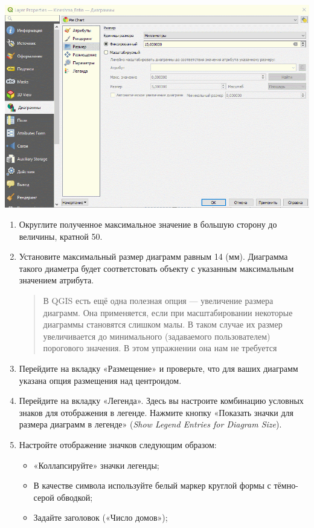 \documentclass[
  12pt,
]{book}
\providecommand{\tightlist}{%
  \setlength{\itemsep}{0pt}\setlength{\parskip}{0pt}}
\begin{document}
\includegraphics{images/Ex05_Vectorization/diagrams1.gif}

\begin{enumerate}
\def\labelenumi{\arabic{enumi}.}
\setcounter{enumi}{5}
\item
  Округлите полученное максимальное значение в большую сторону до величины, кратной 50.
\item
  Установите максимальный размер диаграмм равным 14 (мм). Диаграмма такого диаметра будет соответстовать объекту с указанным максимальным значением атрибута.

  \begin{quote}
  В QGIS есть ещё одна полезная опция --- увеличение размера диаграмм. Она применяется, если при масштабировании некоторые диаграммы становятся слишком малы. В таком случае их размер увеличивается до минимального (задаваемого пользователем) порогового значения. В этом упражнении она нам не требуется
  \end{quote}
\item
  Перейдите на вкладку «Размещение» и проверьте, что для ваших диаграмм указана опция размещения над центроидом.
\item
  Перейдите на вкладку «Легенда». Здесь вы настроите комбинацию условных знаков для отображения в легенде. Нажмите кнопку «Показать значки для размера диаграмм в легенде» (\emph{Show Legend Entries for Diagram Size}).
\item
  Настройте отображение значков следующим образом:

  \begin{itemize}
  \tightlist
  \item
    «Коллапсируйте» значки легенды;
  \item
    В качестве символа используйте белый маркер круглой формы с тёмно-серой обводкой;
  \item
    Задайте заголовок («Число домов»);
  \end{itemize}
\end{enumerate}
\end{document}

